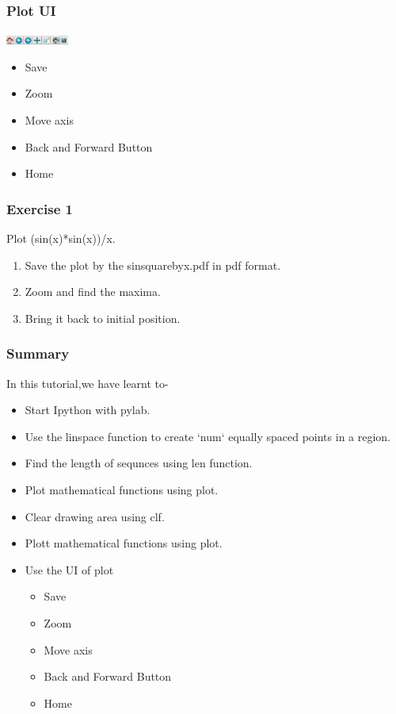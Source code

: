 \documentclass[presentation]{beamer}
\begin{document}
\begin{frame}
\frametitle{Plot UI}
\label{sec-4}

   \includegraphics[height=0.12in, interpolate=true]{buttons}

\begin{itemize}
\item Save
\item Zoom
\item Move axis
\item Back and Forward Button
\item Home
\end{itemize}
\end{frame}
\begin{frame}
\frametitle{Exercise 1}
\label{sec-5}

  Plot (sin(x)*sin(x))/x.

\begin{enumerate}
\item Save the plot by the sinsquarebyx.pdf in pdf format.
\item Zoom and find the maxima.
\item Bring it back to initial position.
\end{enumerate}
\end{frame}
\begin{frame}
\frametitle{Summary}
\label{sec-6}

  In this tutorial,we have learnt to-

\begin{itemize}
\item Start Ipython with pylab.
\item Use the linspace function to create `num` equally spaced points in a region.
\item Find the length of sequnces using len function.
\item Plot mathematical functions using plot.
\item Clear drawing area using clf.
\item Plott mathematical functions using plot.
\item Use the UI of plot
\begin{itemize}
\item Save
\item Zoom
\item Move axis
\item Back and Forward Button
\item Home
\end{itemize}
\end{itemize}
 
\end{frame}
\end{document}
